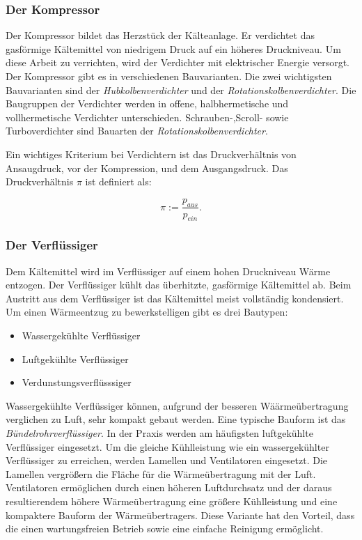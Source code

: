 \subsubsection*{Der Kompressor}
Der Kompressor bildet das Herzstück der Kälteanlage. Er verdichtet das gasförmige Kältemittel von niedrigem Druck auf ein höheres Druckniveau. Um diese Arbeit zu verrichten, wird der Verdichter mit elektrischer Energie versorgt. Der Kompressor gibt es in verschiedenen Bauvarianten. Die zwei wichtigsten Bauvarianten sind der \textit{Hubkolbenverdichter} und der \textit{Rotationskolbenverdichter}. Die Baugruppen der Verdichter werden in offene, halbhermetische und vollhermetische Verdichter unterschieden. Schrauben-,Scroll- sowie Turboverdichter sind Bauarten der \textit{Rotationskolbenverdichter}. 



Ein wichtiges Kriterium bei Verdichtern ist das Druckverhältnis von Ansaugdruck, vor der Kompression, und dem Ausgangsdruck. Das Druckverhältnis $\pi$ ist definiert als:



\begin{equation}
\pi := \frac{p_{aus}}{p_{ein}}.
\label{Druckverhältnis}
\end{equation}

\subsubsection*{Der Verflüssiger}

Dem Kältemittel wird im Verflüssiger auf einem hohen Druckniveau Wärme entzogen. Der Verflüssiger kühlt das überhitzte, gasförmige Kältemittel ab. Beim Austritt aus dem Verflüssiger ist das Kältemittel meist vollständig kondensiert. 
Um einen Wärmeentzug zu bewerkstelligen gibt es drei Bautypen:

\begin{itemize}
\item Wassergekühlte Verflüssiger
\item Luftgekühlte Verflüssiger
\item Verdunstungsverflüsssiger
\end{itemize}

Wassergekühlte Verflüssiger können, aufgrund der besseren Wäärmeübertragung verglichen zu Luft, sehr kompakt gebaut werden. Eine typische Bauform ist das \textit{Bündelrohrverflüssiger}.
In der Praxis werden am häufigsten luftgekühlte Verflüssiger eingesetzt. Um die gleiche Kühlleistung wie ein wassergekühlter Verflüssiger zu erreichen, werden Lamellen und Ventilatoren eingesetzt. Die Lamellen vergrößern die Fläche für die Wärmeübertragung mit der Luft. Ventilatoren ermöglichen durch einen höheren Luftdurchsatz und der daraus resultierendem höhere Wärmeübertragung eine größere Kühlleistung und eine kompaktere Bauform der Wärmeübertragers. Diese Variante hat den Vorteil, dass die einen wartungsfreien Betrieb  sowie eine einfache Reinigung ermöglicht.


